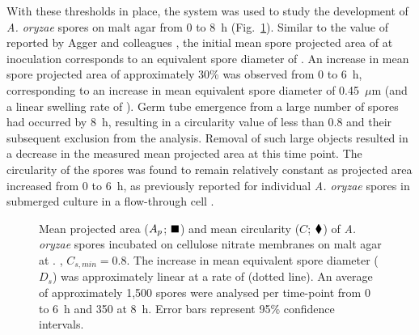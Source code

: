 With these thresholds in place, the system was used to study the development of \emph{A. oryzae} spores on malt agar from 0 to 8~h (Fig.~\ref{fig:ApsCsT}). Similar to the value of  reported by Agger and colleagues \cite{agger1998}, the initial mean spore projected area of  at inoculation corresponds to an equivalent spore diameter of . An increase in mean spore projected area of approximately 30\% was observed from 0 to 6~h, corresponding to an increase in mean equivalent spore diameter of 0.45~$\mu$m (and a linear swelling rate of ). Germ tube emergence from a large number of spores had occurred by 8~h, resulting in a circularity value of less than 0.8 and their subsequent exclusion from the analysis. Removal of such large objects resulted in a decrease in the measured mean projected area at this time point. The circularity of the spores was found to remain relatively constant as projected area increased from 0 to 6~h, as previously reported for individual \emph{A. oryzae} spores in submerged culture in a flow-through cell \cite{spohr1998}.

\begin{figure}[tb]
	\centering
	\caption{Mean projected area ($A_p$; $\blacksquare$) and mean circularity ($C$; $\blacklozenge$) of \emph{A. oryzae} spores incubated on cellulose nitrate membranes on malt agar at . , $C_{s, min} = 0.8$. The increase in mean equivalent spore diameter ($D_s$) was approximately linear at a rate of  (dotted line). An average of approximately 1,500 spores were analysed per time-point from 0 to 6~h and 350 at 8~h. Error bars represent 95\% confidence intervals.}
	\label{fig:ApsCsT}
\end{figure}

